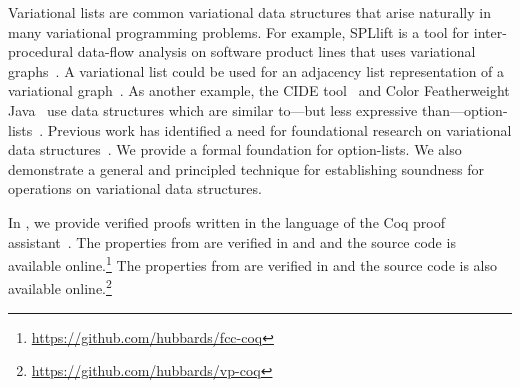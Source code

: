 Variational lists are common variational data structures that arise naturally in many variational programming problems.
For example, SPLlift is a tool for inter-procedural data-flow analysis on software product lines that uses variational graphs~\citep{Bod13}.
A variational list could be used for an adjacency list representation of a variational graph~\citep{Walk14onward}.
As another example, the CIDE tool~\citep{KAK08} and Color Featherweight Java~\citep{Kas12} use data structures which are similar to---but less expressive than---option-lists~\citep{Walk14onward}.
Previous work has identified a need for foundational research on variational data structures~\citep{Walk14onward}.
We provide a formal foundation for option-lists.
We also demonstrate a general and principled technique for establishing soundness for operations on variational data structures.

In , we provide verified proofs written in the language of the Coq proof assistant~\citep{BC04}.
The properties from  are verified in  and  and the source code is available online.\footnote{\url{https://github.com/hubbards/fcc-coq}}
The properties from  are verified in  and the source code is also available online.\footnote{\url{https://github.com/hubbards/vp-coq}}
